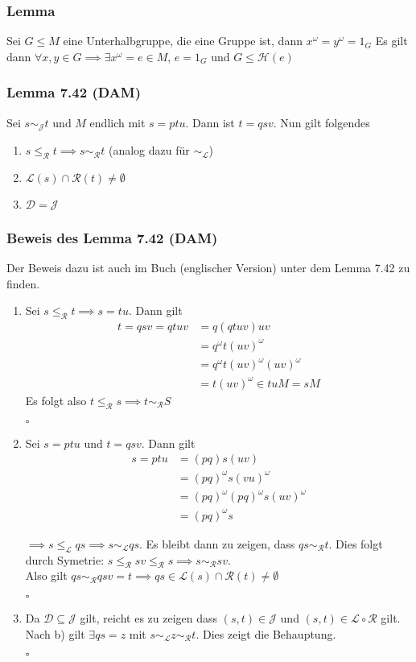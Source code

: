 \documentclass[12pt, german]{article}
\newcommand{\pom}{^{\omega}}
\newcommand{\grel}{\sim_{\mathcal{L}}}
\newcommand{\grer}{\sim_{\mathcal{R}}}
\newcommand{\grej}{\sim_{\mathcal{J}}}
\newcommand{\lgreleq}{\leqslant_{\mathcal{L}}}
\newcommand{\lgrereq}{\leqslant_{\mathcal{R}}}
\newcommand{\bewiesen}{
	
	\begin{flushright}
		$\square$  \\
\end{flushright}}
\begin{document}
	\subsubsection{Lemma}
	Sei $G \leq M$ eine Unterhalbgruppe, die eine Gruppe ist, dann $x\pom = y\pom = 1_G$
	Es gilt dann $\forall x,y \in G \implies \exists x\pom = e \in M, \, e = 1_G$ und $ G \leq \mathcal H(e)$
	
	
	\subsubsection{Lemma 7.42 (DAM)}
	Sei $s \grej t$ und $M$ endlich mit $s = ptu$. Dann ist $t=qsv$. Nun gilt folgendes 
	\begin{enumerate}[label = \alph*)]
		\item $s \lgrereq t \implies s \grer t$ (analog dazu für $\grel$)
		\item $\mathcal{L}(s) \cap \mathcal{R}(t) \not = \emptyset$
		\item $\mathcal{D} = \mathcal{J}$
	\end{enumerate}
	
	\subsubsection{Beweis des Lemma 7.42 (DAM)}
	Der Beweis dazu ist auch im Buch (englischer Version) unter dem Lemma 7.42 zu finden.
	\begin{enumerate}[label = \alph*)]
		\item Sei $s \lgrereq t \implies s = tu$. Dann gilt 
		\begin{align*}
			t=qsv = qtuv&= q(qtuv)uv \\
			&= q\pom t(uv)\pom \\
			&= q\pom t(uv)\pom(uv)\pom \\
			&= t(uv)\pom \in tuM = sM
		\end{align*}
		Es folgt also $t \lgrereq s \implies t \grer S$
		\bewiesen
		
		\item Sei $s=ptu$ und $t=qsv$. Dann gilt 
		\begin{align*}
			s=ptu &= (pq)s(uv) \\
			&=(pq)\pom s(vu)\pom \\
			&= (pq)\pom(pq)\pom s (uv)\pom \\
			&= (pq)\pom s
		\end{align*}
		
		$\implies s \lgreleq qs \implies s \grel qs$. Es bleibt dann zu zeigen, dass $qs \grer t$. 
		Dies folgt durch Symetrie: $s \lgrereq sv \lgrereq s \implies s \grer sv$. \\ 
		Also gilt $qs \grer qsv = t \implies qs \in \mathcal{L}(s) \cap \mathcal{R}(t) \not = \emptyset$
		\bewiesen
		
		\item Da $\mathcal{D} \subseteq \mathcal{J}$ gilt, reicht es zu zeigen dass $(s,t) \in \mathcal{J}$ und $(s,t) \in \mathcal{L} \circ \mathcal{R}$ gilt. 
		Nach b) gilt $\exists qs = z$ mit $s \grel z \grer t$. Dies zeigt die Behauptung.
		\bewiesen
	\end{enumerate}
	
\end{document}
